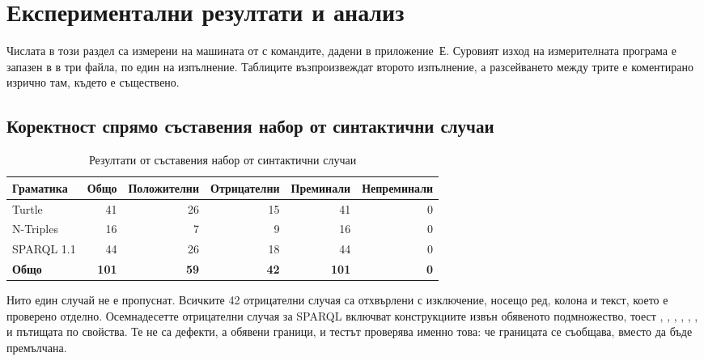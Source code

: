 \section{Експериментални резултати и анализ}
\label{sec:results}

Числата в този раздел са измерени на машината от  с командите,
дадени в приложение~Е. Суровият изход на измерителната програма е запазен в
 в три файла, по един на изпълнение. Таблиците възпроизвеждат
второто изпълнение, а разсейването между трите е коментирано изрично там, където е
съществено.

\subsection{Коректност спрямо съставения набор от синтактични случаи}

\begin{table}[H]
\caption{Резултати от съставения набор от синтактични случаи}
\label{tab:correctness}
\centering
\fontsize{10}{12}\selectfont
\begin{tabular}{@{}L{2.6cm}rrrrr@{}}
\toprule
\textbf{Граматика} & \textbf{Общо} & \textbf{Положителни} & \textbf{Отрицателни} & \textbf{Преминали} & \textbf{Непреминали} \\
\midrule
Turtle       & 41 & 26 & 15 & 41 & 0 \\
N-Triples    & 16 &  7 &  9 & 16 & 0 \\
SPARQL 1.1   & 44 & 26 & 18 & 44 & 0 \\
\midrule
\textbf{Общо} & \textbf{101} & \textbf{59} & \textbf{42} & \textbf{101} & \textbf{0} \\
\bottomrule
\end{tabular}
\end{table}

Нито един случай не е пропуснат. Всичките 42 отрицателни случая са отхвърлени с
изключение, носещо ред, колона и текст, което е проверено отделно. Осемнадесетте
отрицателни случая за SPARQL включват конструкциите извън обявеното подмножество, тоест
, , , , , ,
 и пътищата по свойства. Те не са дефекти, а обявени граници, и тестът
проверява именно това: че границата се съобщава, вместо да бъде премълчана.


